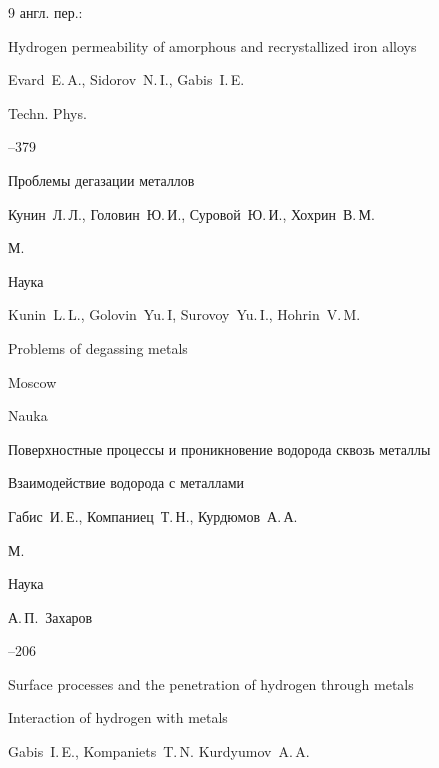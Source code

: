 \begin{thebibliography}{9}
\transl англ. пер.:~

\paper Hydrogen permeability of amorphous and recrystallized iron alloys 

\by  Evard~E.\,A.,  Sidorov~N.\,I.,  Gabis~I.\,E.

\jour Techn. Phys.




--379






\book Проблемы дегазации металлов

\by Кунин~Л.\,Л., Головин~Ю.\,И., Суровой~Ю.\,И., Хохрин~В.\,М.

\publaddr М.

\publ Наука



\misctransl

\by Kunin~L.\,L., Golovin~Yu.\,I, Surovoy~Yu.\,I., Hohrin~V.\,M. 

\book Problems of degassing metals

\publaddr Moscow

\publ Nauka








\paper Поверхностные процессы и проникновение водорода сквозь металлы

\inbook Взаимодействие водорода с металлами

\by Габис~И.\,Е., Компаниец~Т.\,Н., Курдюмов~А.\,А.

\publaddr М.

\publ Наука

\ed А.\,П.~Захаров


--206

\misctransl 

\paper Surface processes and the penetration of hydrogen through metals

\inbook Interaction of hydrogen with metals

\by Gabis~I.\,E., Kompaniets~T.\,N. Kurdyumov~A.\,A.


\end{thebibliography}

